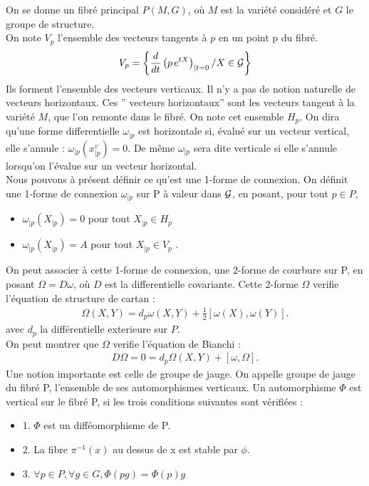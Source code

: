 \documentclass[a4paper,11pt]{article}
\theoremstyle{plain}
\theoremstyle{definition}
\theoremstyle{remark}
\numberwithin{equation}{section}
\numberwithin{equation}{subsection}
\numberwithin{figure}{section}
\begin{document}
\noindent
On se donne un fibré principal $P(M,G)$, où $M$ est la variété considéré et $G$ le groupe de structure.\\
On note $V_{p}$ l'ensemble des vecteurs tangents à $p$ en un point p du fibré.
\begin{eqnarray}
 V_{p} = \left \{  \frac{d}{dt} \left( p\hspace{0.5mm} e^{tX} \right)_{|t=0} / X \in \cal{G}  \right \}
\end{eqnarray}
Ils forment l'ensemble des vecteurs verticaux. Il n'y a pas de notion naturelle de vecteurs horizontaux. Ces '' vecteurs horizontaux'' 
sont les vecteurs tangent à la variété $M$, que l'on remonte dans le fibré. On note cet ensemble $H_{p}$. On dira qu'une forme differentielle 
$\omega_{|p}$ est horizontale si, évalué sur un vecteur vertical, elle s'annule : $\omega_ {|p} (x^{v}_{|p}) = 0$. De même $\omega_{|p}$ sera 
dite verticale si elle s'annule lorsqu'on l'évalue sur un vecteur horizontal.\\
Nous pouvons à présent définir ce qu'est une 1-forme de connexion. On définit une 1-forme de connexion $\omega_{|p}$ sur P à valeur dans 
$\cal{G}$, en posant, pour tout $p \in P$,
\begin{itemize}
 \item $\omega_{|p} (X_{|p}) = 0$ pour tout $X_{|p} \in H_{p}$
 \item $\omega_{|p} (X_{|p}) = A$ pour tout $X_{|p} \in V_{p}$ .
\end{itemize}
On peut associer à cette 1-forme de connexion, une 2-forme de courbure sur P, en posant $\Omega = D \omega$, où $D$ est la differentielle covariante. 
Cette 2-forme $\Omega$ verifie l'équation de structure de cartan :
\begin{eqnarray}
 \Omega (X,Y) = d_{p} \omega (X,Y) + \frac{1}{2} \left [ \omega (X) , \omega (Y) \right ].
\end{eqnarray}
avec $d_{p}$ la différentielle exterieure sur $P$. \\
On peut montrer que $\Omega$ verifie l'équation de Bianchi :
\begin{eqnarray}
 D \Omega = 0 = d_{p} \Omega (X,Y) +  \left [ \omega  , \Omega  \right ].
\end{eqnarray}
Une notion importante est celle de groupe de jauge. On appelle groupe de jauge du fibré P, l'ensemble de ses automorphismes verticaux. 
Un automorphisme $\Phi$ est vertical sur le fibré P, si les trois conditions suivantes sont vérifiées :
\begin{itemize}
 \renewcommand{\labelitemi}{$\bullet$}
 \item 1. $\Phi$ est un difféomorphisme de P.
 \item 2. La fibre $\pi^{-1} (x)$ au dessus de x est stable par $\phi$.
 \item 3. $\forall p \in P, \forall g \in G , \Phi (pg) = \Phi(p) g$
\end{itemize}
\end{document}
